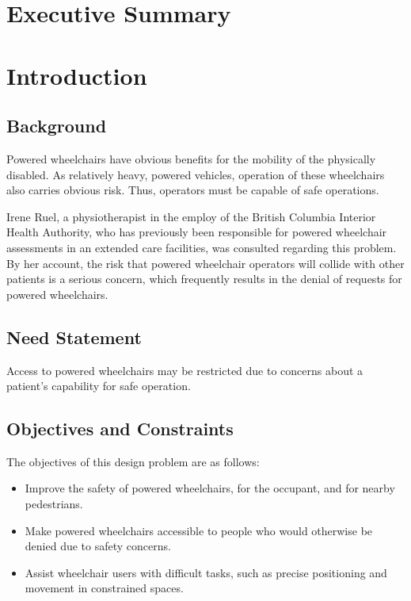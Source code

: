 \documentclass[oneside,final]{report}
\begin{document}
\chapter*{Executive Summary}

\clearpage
\setcounter{page}{1}
\pagestyle{headings}

\chapter{Introduction}

\section{Background}
Powered wheelchairs have obvious benefits for the mobility of the physically disabled.  As relatively heavy, powered vehicles, operation of these wheelchairs also carries obvious risk.  Thus, operators must be capable of safe operations.

Irene Ruel, a physiotherapist in the employ of the British Columbia Interior Health Authority, who has previously been responsible for powered wheelchair assessments in an extended care facilities, was consulted regarding this problem.  By her account, the risk that powered wheelchair operators will collide with other patients is a serious concern, which frequently results in the denial of requests for powered wheelchairs.

\section{Need Statement}
Access to powered wheelchairs may be restricted due to concerns about a patient's capability for safe operation.

\section{Objectives and Constraints}
The objectives of this design problem are as follows:

\begin{itemize}
 \item Improve the safety of powered wheelchairs, for the occupant, and for nearby pedestrians.
 \item Make powered wheelchairs accessible to people who would otherwise be denied due to safety concerns. 
 \item Assist wheelchair users with difficult tasks, such as precise positioning and movement in constrained spaces.  
\end{itemize}
\end{document}
